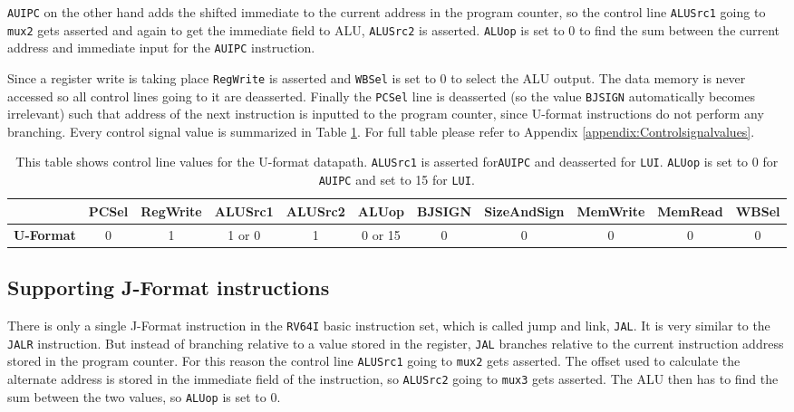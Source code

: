          \texttt{AUIPC} on the other hand adds the shifted immediate to the current address in the program counter, so the control line \texttt{ALUSrc1} going to \texttt{mux2} gets asserted and again to get the immediate field to ALU, \texttt{ALUSrc2} is asserted. \texttt{ALUop} is set to 0 to find the sum between the current address and immediate input for the \texttt{AUIPC} instruction.
         
         Since a register write is taking place \texttt{RegWrite} is asserted and \texttt{WBSel} is set to 0 to select the ALU output. The data memory is never accessed so all control lines going to it are deasserted. Finally the \texttt{PCSel} line is deasserted (so the value \texttt{BJSIGN} automatically becomes irrelevant) such that address of the next instruction is inputted to the program counter, since U-format instructions do not perform any branching. Every control signal value is summarized in Table \ref{table:UFORMAT}. For full table please refer to Appendix \ref{appendix:Controlsignalvalues}.
    
        \begin{table}[h!]
            \small
            \hspace{-2.4cm}
            \begin{tabular}{|c||c|c|c|c|c|c|c|c|c|c|}
            	\hline
            	                  & \textbf{PCSel} & \textbf{RegWrite} & \textbf{ALUSrc1} & \textbf{ALUSrc2} & \textbf{ALUop} & \textbf{BJSIGN} & \textbf{SizeAndSign} & \textbf{MemWrite} & \textbf{MemRead} & \textbf{WBSel} \\ \hline\hline
            	\textbf{U-Format} &       0        &         1         &      1 or 0      &        1         &    0 or 15     &        0        &          0           &         0         &        0         &       0        \\ \hline
            \end{tabular}
            \caption{This table shows control line values for the U-format datapath. \texttt{ALUSrc1} is asserted for\texttt{AUIPC} and deasserted for \texttt{LUI}. \texttt{ALUop} is set to 0 for \texttt{AUIPC} and set to 15 for \texttt{LUI}.}
            \label{table:UFORMAT}
        \end{table}
    
    \subsection{Supporting J-Format instructions}
        There is only a single J-Format instruction in the \texttt{RV64I} basic instruction set, which is called jump and link, \texttt{JAL}. It is very similar to the \texttt{JALR} instruction. But instead of branching relative to a value stored in the register, \texttt{JAL} branches relative to the current instruction address stored in the program counter. For this reason the control line \texttt{ALUSrc1} going to \texttt{mux2} gets asserted. The offset used to calculate the alternate address is stored in the immediate field of the instruction, so \texttt{ALUSrc2} going to \texttt{mux3} gets asserted. The ALU then has to find the sum between the two values, so \texttt{ALUop} is set to 0.
        
